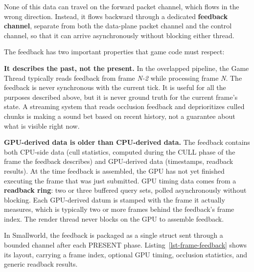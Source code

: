 \documentclass[
  11pt,
  letterpaper,
  DIV=11,
  numbers=noendperiod,
  twoside,
  open=right]{scrreprt}
\begin{document}
None of this data can travel on the forward packet channel, which flows
in the wrong direction. Instead, it flows backward through a dedicated
\textbf{feedback channel}, separate from both the data-plane packet
channel and the control channel, so that it can arrive asynchronously
without blocking either thread.

The feedback has two important properties that game code must respect:

\textbf{It describes the past, not the present.} In the overlapped
pipeline, the Game Thread typically reads feedback from frame \emph{N-2}
while processing frame \emph{N}. The feedback is never synchronous with
the current tick. It is useful for all the purposes described above, but
it is never ground truth for the current frame's state. A streaming
system that reads occlusion feedback and deprioritizes culled chunks is
making a sound bet based on recent history, not a guarantee about what
is visible right now.

\textbf{GPU-derived data is older than CPU-derived data.} The feedback
contains both CPU-side data (cull statistics, computed during the CULL
phase of the frame the feedback describes) and GPU-derived data
(timestamps, readback results). At the time feedback is assembled, the
GPU has not yet finished executing the frame that was just submitted.
GPU timing data comes from a \textbf{readback ring}: two or three
buffered query sets, polled asynchronously without blocking. Each
GPU-derived datum is stamped with the frame it actually measures, which
is typically two or more frames behind the feedback's frame index. The
render thread never blocks on the GPU to assemble feedback.

In Smallworld, the feedback is packaged as a single struct sent through
a bounded channel after each PRESENT phase.
Listing~\ref{lst-frame-feedback} shows its layout, carrying a frame
index, optional GPU timing, occlusion statistics, and generic readback
results.
\end{document}
